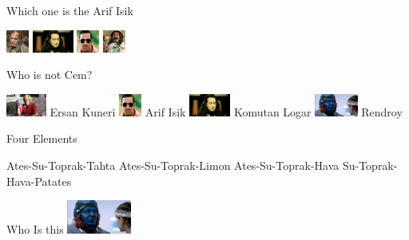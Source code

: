 \documentclass{exam}
\begin{document}
\begin{questions}
\question Which one is the Arif Isik\newline
\begin{oneparchoices}
\choice \includegraphics[height=2em]{216.jpg}
\choice \includegraphics[height=2em]{komutanlogar.jpeg}
\choice \includegraphics[height=2em]{arifisik.jpg}
\choice \includegraphics[height=2em]{faruk.jpg}
\end{oneparchoices}
\question Who is not Cem?\newline
\begin{oneparchoices}
\choice \includegraphics[height=2em]{ersan.jpg}
Ersan Kuneri
\choice \includegraphics[height=2em]{arifisik.jpg}
Arif Isik
\choice \includegraphics[height=2em]{komutanlogar.jpeg}
Komutan Logar
\choice \includegraphics[height=2em]{rendroy2.jpg}
Rendroy
\end{oneparchoices}
\question Four Elements\newline
\begin{oneparchoices}
\choice Ates-Su-Toprak-Tahta
\choice Ates-Su-Toprak-Limon
\choice Ates-Su-Toprak-Hava
\choice Su-Toprak-Hava-Patates
\end{oneparchoices}
\question Who Is this\newline
\includegraphics[height=3em]{rendroy2.jpg} \newline

\end{questions}
\end{document}
